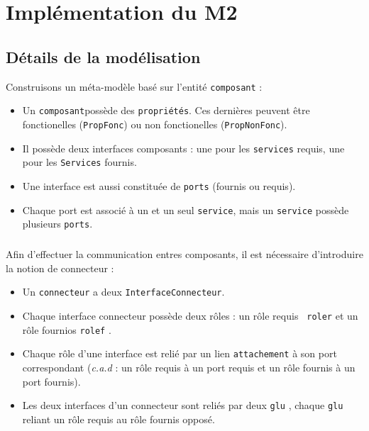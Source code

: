 \chapter{Implémentation du M2}\label{chap:M2}
\section{Détails de la modélisation}
Construisons un méta-modèle basé sur l'entité \verb+composant+ :
\begin{itemize}
\item 
  Un \verb+composant+possède des \verb+propriétés+. Ces dernières peuvent être fonctionelles (\verb+PropFonc+) ou non fonctionelles (\verb+PropNonFonc+).
\item 
  Il possède deux interfaces composants :  une pour les \verb+services+ requis, une pour les \verb+Services+ fournis.
\item
  Une interface est aussi constituée de \verb+ports+ (fournis ou requis). 
\item
  Chaque port est associé à un et un seul \verb+service+, mais un \verb+service+ possède plusieurs \verb+ports+.  
\end{itemize}


\paragraph{}
Afin d'effectuer la communication entres composants, il est nécessaire d'introduire la notion de connecteur :

\begin{itemize}
\item 
  Un \verb+connecteur+ a deux \verb+InterfaceConnecteur+.
\item
  Chaque interface connecteur possède deux rôles : un rôle requis \verb+ roler+  et un rôle fournios \verb+rolef+ .
\item
  Chaque rôle d'une interface est relié par un lien \verb+attachement+  à son port correspondant (\textit{c.a.d }: un rôle requis à un port requis et un rôle fournis à un port fournis).  
\item
  Les deux interfaces d'un connecteur sont reliés par deux \verb+glu+  , chaque \verb+glu+  reliant un rôle requis au rôle fournis opposé.
\end{itemize}

\paragraph{}

